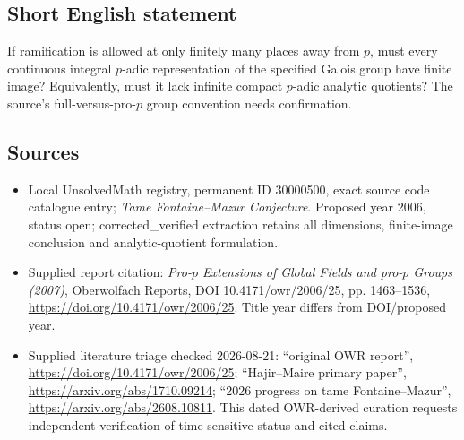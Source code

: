\documentclass[11pt]{article}
\begin{document}
\subsection{Short English statement}
If ramification is allowed at only finitely many places away from $p$, must every continuous integral $p$-adic representation of the specified Galois group have finite image? Equivalently, must it lack infinite compact $p$-adic analytic quotients? The source's full-versus-pro-$p$ group convention needs confirmation.
\subsection{Sources}
\begin{itemize}
\item Local UnsolvedMath registry, permanent ID 30000500, exact source code catalogue entry; \emph{Tame Fontaine--Mazur Conjecture}. Proposed year 2006, status open; corrected\_verified extraction retains all dimensions, finite-image conclusion and analytic-quotient formulation.
\item Supplied report citation: \emph{Pro-$p$ Extensions of Global Fields and pro-$p$ Groups (2007)}, Oberwolfach Reports, DOI 10.4171/owr/2006/25, pp. 1463--1536, \url{https://doi.org/10.4171/owr/2006/25}. Title year differs from DOI/proposed year.
\item Supplied literature triage checked 2026-08-21: ``original OWR report'', \url{https://doi.org/10.4171/owr/2006/25}; ``Hajir--Maire primary paper'', \url{https://arxiv.org/abs/1710.09214}; ``2026 progress on tame Fontaine--Mazur'', \url{https://arxiv.org/abs/2608.10811}. This dated OWR-derived curation requests independent verification of time-sensitive status and cited claims.
\end{itemize}
\end{document}
